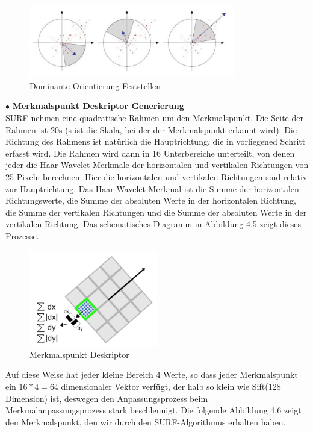 \begin{figure}[htb]
 \centering 
 \includegraphics[keepaspectratio,width=0.8\textwidth]{images/4_ZweiteErfahrung/Dominante_Orientierung_Feststellen.pdf}
 \caption{Dominante Orientierung Feststellen}
 \label{fig:Dominante Orientierung Feststellen}
\end{figure} 


$\bullet$ \textbf{Merkmalspunkt Deskriptor Generierung}\\
SURF nehmen eine quadratische Rahmen um den Merkmalspunkt. Die Seite der Rahmen ist 20s (s ist die Skala, bei der der Merkmalspunkt erkannt wird). Die Richtung des Rahmens ist natürlich die Hauptrichtung, die in vorliegened Schritt erfasst wird. Die Rahmen wird dann in 16 Unterbereiche unterteilt, von denen jeder die Haar-Wavelet-Merkmale der horizontalen und vertikalen Richtungen von 25 Pixeln berechnen. Hier die horizontalen und vertikalen Richtungen sind relativ zur Hauptrichtung. Das Haar Wavelet-Merkmal ist die Summe der horizontalen Richtungswerte, die Summe der absoluten Werte in der horizontalen Richtung, die Summe der vertikalen Richtungen und die Summe der absoluten Werte in der vertikalen Richtung. Das schematisches Diagramm in Abbildung 4.5 zeigt dieses Prozesse.

\begin{figure}[htb]
 \centering 
 \includegraphics[keepaspectratio,width=0.5\textwidth]{images/4_ZweiteErfahrung/Merkmalspunkt_Deskriptor.pdf}
 \caption{Merkmalspunkt Deskriptor}
 \label{fig:Merkmalspunkt Deskriptor}
\end{figure} 

Auf diese Weise hat jeder kleine Bereich 4 Werte, so dass jeder Merkmalspunkt ein $16*4=64$ dimensionaler Vektor verfügt, der halb so klein wie Sift(128 Dimension) ist, deswegen den Anpassungsprozess beim Merkmalanpassungsprozess stark beschleunigt. Die folgende Abbildung 4.6 zeigt den Merkmalspunkt, den wir durch den SURF-Algorithmus erhalten haben.

